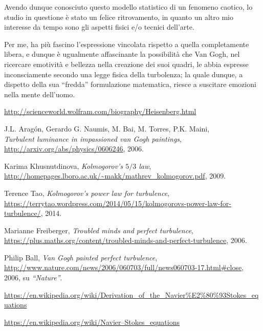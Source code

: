 \documentclass[12pt,a4paper]{article}
\numberwithin{equation}{subsection}
\begin{document}
Avendo dunque conosciuto questo modello statistico di un fenomeno caotico, lo studio in questione \cite{study2006} è stato un felice ritrovamento, in quanto un altro mio interesse da tempo sono gli aspetti fisici e/o tecnici dell'arte.

Per me, ha più fascino l'espressione vincolata rispetto a quella completamente libera, e dunque è ugualmente affascinante la possibilità che Van Gogh, nel ricercare emotività e bellezza nella creazione dei suoi quadri, le abbia espresse inconsciamente secondo una legge fisica della turbolenza; la quale dunque, a dispetto della sua ``fredda'' formulazione matematica, riesce a suscitare emozioni nella mente dell'uomo.

\begin{thebibliography}{1}

  \url{http://scienceworld.wolfram.com/biography/Heisenberg.html}

  J.L. Aragón, Gerardo G. Naumis, M. Bai, M. Torres, P.K. Maini, \\
  \emph{Turbulent luminance in impassioned van Gogh paintings}, \\
  \url{http://arxiv.org/abs/physics/0606246}, 
  2006.

  Karima Khusnutdinova, 
  \emph{Kolmogorov's $5/3$ law}, \\
  \url{http://homepages.lboro.ac.uk/~makk/mathrev_kolmogorov.pdf},
  2009.
  
  Terence Tao,
  \emph{Kolmogorov’s power law for turbulence}, \\
  \url{https://terrytao.wordpress.com/2014/05/15/kolmogorovs-power-law-for-turbulence/}, 2014.

  Marianne Freiberger, 
  \emph{Troubled minds and perfect turbulence}, \\
  \url{https://plus.maths.org/content/troubled-minds-and-perfect-turbulence},
  2006.
  
  Philip Ball, 
  \emph{Van Gogh painted perfect turbulence}, \\
  \url{http://www.nature.com/news/2006/060703/full/news060703-17.html#close},
  2006,
  su \emph{``Nature''}.


  \url{https://en.wikipedia.org/wiki/Derivation_of_the_Navier%E2%80%93Stokes_equations}
  
  \url{https://en.wikipedia.org/wiki/Navier–Stokes_equations}


\end{thebibliography}
\end{document}
